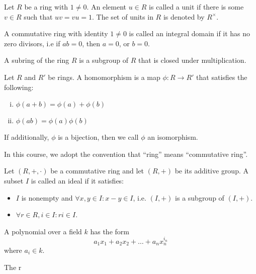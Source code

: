 \begin{defn}[Unit]
  Let $R$ be a ring with $1 \neq 0$. An element $u \in R$ is called a unit if
  there is some $v \in R$ such that $uv=vu=1$. The set of units in $R$ is
  denoted by $R^\times$.
\end{defn}


\begin{defn}
  A commutative ring with identity $1 \neq 0$ is called an integral domain if it
  has no zero divisors, i.e if $ab=0$, then $a=0$, or $b=0$.
\end{defn}


\begin{defn}[Subring]
  A subring of the ring $R$ is a subgroup of $R$ that is closed under
  multiplication.
\end{defn}


\begin{defn}
  Let $R$ and $R'$ be rings. A homomorphism is a map $\phi: R \rightarrow R'$
  that satisfies the following:
  \begin{enumerate}[(i)]
    \item $\phi(a+b) = \phi(a) + \phi(b)$
    \item $\phi(ab) = \phi(a) \phi(b)$
  \end{enumerate}
  
  If additionally, $\phi$ is a bijection, then we call $\phi$ an isomorphism.
\end{defn}


\begin{defn}[Ideal]
\end{defn}


\begin{remark}
  In this course, we adopt the convention that ``ring'' means ``commutative
  ring''.
\end{remark}



\begin{defn}
  Let $(R,+,\cdot)$ be a commutative ring and let $(R, +)$ be its additive
  group. A subset $I$ is called an ideal if it satisfies:
  \begin{itemize}
    \item $I$ is nonempty and $\forall x,y \in I : x-y \in I$, i.e. $(I,+)$ is a
    subgroup of $(I,+)$.
    \item $\forall r \in R, i \in I : ri \in I$.
  \end{itemize}
\end{defn}


\begin{defn}
  A polynomial over a field $k$ has the form
  \[ a_1 x_1 + a_2 x_2 + \ldots + a_n x_n^{i_n}\]
  where $a_i \in k$.
\end{defn}

\begin{defn}
  The r
\end{defn}